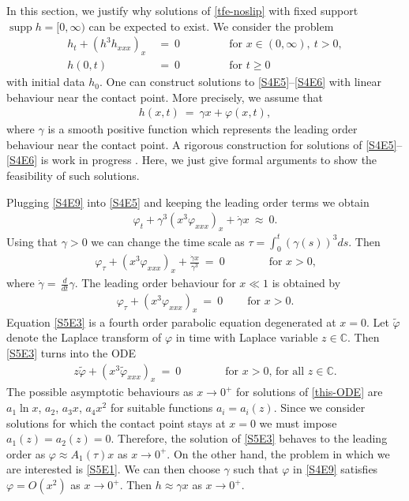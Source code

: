 \documentclass[pagesize,pdftex]{amsart}
\renewcommand{\tilde}{\widetilde}
\newcommand{\C}{\mathbb{C}}
\newcommand{\gam}{\gamma}
\renewcommand{\phi}{\varphi}
\newcommand{\ddt}{\, \frac{d}{dt}}
\DeclareMathOperator{\supp}{supp}
\begin{document}
In this section, we justify why solutions of \eqref{tfe-noslip} with fixed
support $\supp h = [0,\infty)$ can be expected to exist. We consider the
problem%
\begin{align}  h_t +(h^3h_{xxx})_x\ %
  &= \ 0\ \ \qquad\qquad\text{for }x\in (0,\infty ), \  t>0,  \label{S4E5} \\
  h(0,t) \ %
  &= \ 0\ \ \qquad\qquad\text{for }t\geq 0  \label{S4E6}
\end{align}
with initial data $h_0$. One can construct solutions to \eqref{S4E5}--\eqref{S4E6} with linear behaviour
near the contact point. More precisely, we assume that
\begin{align}   \label{S4E9} %
  h(x,t) \ %
  = \ \gam x + \phi (x,t),
\end{align}
where $\gam$ is a smooth positive function which represents the leading order
behaviour near the contact point. A rigorous construction for solutions of
\eqref{S4E5}--\eqref{S4E6} is work in progress \cite{GKV-preprint}. Here, we
just give formal arguments to show the feasibility of such solutions.

\medskip

Plugging \eqref{S4E9} into \eqref{S4E5} and keeping the leading order terms we
obtain%
\begin{align}
  \phi_t + \gam^3(x^3\phi_{xxx})_x + \dot{\gam} x \ %
  \approx \ 0.
\end{align}
Using that $\gam >0$ we can change the time scale as
$\tau = \int_{0}^{t}(\gam(s) )^3ds$. Then%
\begin{align}
  \phi_{\tau }+(x^3\phi_{xxx})_x + \frac{\dot{\gam} x}{\gam^3} \ = \ 0 \qquad\qquad %
  \text{for $x>0$,} \label{S5E1}
\end{align}%
where $\dot \gam = \ddt \gam$. The leading order behaviour for $x \ll 1$ is
obtained by%
\begin{align}
  \phi_{\tau} + (x^3\phi_{xxx})_x \ = \ 0 \ \qquad %
  \text{for $x>0$.}
\label{S5E3}
\end{align}
Equation \eqref{S5E3} is a fourth order parabolic equation degenerated at
$x=0$. Let $\tilde{\phi}$ denote the Laplace transform of $\phi$ in time with
Laplace variable $z \in \C$. Then \eqref{S5E3} turns into the ODE %
\begin{align} \label{this-ODE} %
  z \tilde{\phi}+(x^3\tilde{\phi}_{xxx})_x \ %
  = \ 0\qquad\qquad %
  \text{for $x>0$, for all $z \in \C$}.
\end{align}
The possible asymptotic behaviours as $x\to 0^+$ for solutions of
\eqref{this-ODE} are $a_1 \ln x$, $a_2$, $a_3 x$, $a_4 x^{2}$ for suitable
functions $a_i = a_i(z)$. Since we consider solutions for which the contact
point stays at $x=0$ we must impose $a_1(z) =a_{2}(z) =0$.  Therefore, the
solution of \eqref{S5E3} behaves to the leading order as $%
\phi \approx A_1(\tau ) x$ as $%
x\to 0^+$. On the other hand, the problem in which we are interested is
\eqref{S5E1}. We can then choose $\gam$ such that $\phi$ in \eqref{S4E9}
satisfies $\phi =O(x^{2})$ as $x\to 0^+$. Then $h \approx \gam x$ as
$x \to 0^+$.
\end{document}
